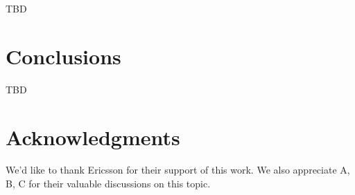 \documentclass[11pt,sigconf]{iabart}
\begin{document}
TBD


\section{Conclusions} \label{conclusions}

TBD

\section{Acknowledgments}

We'd like to thank Ericsson for their support of this work. We also appreciate A, B, C for their valuable discussions on this topic.



\end{document}
